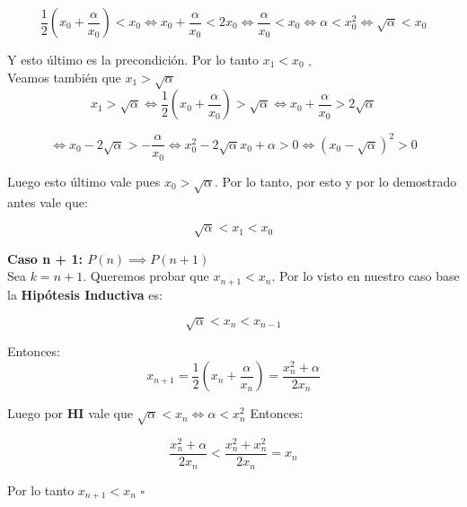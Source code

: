 \begin{displaymath}
    \frac{1}{2}(x_0 + \frac{\alpha}{x_0}) < x_0 \iff x_0 + \frac{\alpha}{x_0} < 2x_0 \iff \frac{\alpha}{x_0} < x_0 \iff \alpha < x_0^2 \iff \sqrt{\alpha} < x_0
\end{displaymath}

Y esto último es la precondición. Por lo tanto $x_1 < x_0$ $_\square$\\

Veamos también que $x_1 > \sqrt{\alpha}$\\

\begin{displaymath}
    x_1 > \sqrt{\alpha} \iff \frac{1}{2}(x_0 + \frac{\alpha}{x_0}) > \sqrt{\alpha} \iff x_0 + \frac{\alpha}{x_0} > 2\sqrt{\alpha}
\end{displaymath}

\begin{displaymath}
    \iff x_0 - 2\sqrt{\alpha} > -\frac{\alpha}{x_0} \iff x_0^2 - 2\sqrt{\alpha}x_0 + \alpha > 0 \iff (x_0 - \sqrt{\alpha})^2 > 0
\end{displaymath}

Luego esto último vale pues $x_0 > \sqrt{\alpha}$. Por lo tanto, por esto y por lo demostrado antes vale que:

\begin{displaymath}
    \sqrt{\alpha} < x_1 < x_0
\end{displaymath}

{\bf Caso n + 1: $P(n) \implies P(n + 1)$}\\
Sea $k = n + 1$. Queremos probar que $x_{n + 1} < x_n$. Por lo visto en nuestro caso base la {\bf Hipótesis Inductiva} es:

\begin{displaymath}
    \sqrt{\alpha} < x_n < x_{n - 1}
\end{displaymath}

Entonces:
\begin{displaymath}
    x_{n + 1} = \frac{1}{2}(x_n + \frac{\alpha}{x_n}) = \frac{x_n^2 + \alpha}{2x_n}
\end{displaymath}

Luego por {\bf HI} vale que $\sqrt{\alpha} < x_n \iff \alpha < x_n^2 $ Entonces:

\begin{displaymath}
    \frac{x_n^2 + \alpha}{2x_n} < \frac{x_n^2 + x_n^2}{2x_n} = x_n
\end{displaymath}

Por lo tanto $x_{n + 1} < x_n$ $\square$

